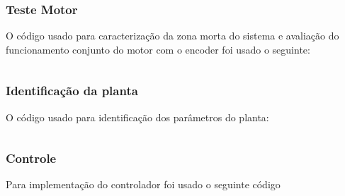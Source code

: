 \documentclass[a4paper,11pt]{article}
\begin{document}
\newpage
\subsubsection*{Teste Motor}
O código usado para caracterização da zona morta do sistema e avaliação do funcionamento conjunto do motor com o encoder foi usado o seguinte:
\inputminted[xleftmargin=15pt,linenos,frame=single,framesep=5pt,breaklines=true]{c++}{../arduino/test_dcmotor_characterization/test_dcmotor_characterization.ino}

\newpage
\subsubsection*{Identificação da planta}
O código usado para identificação dos parâmetros do planta:
\inputminted[xleftmargin=15pt,linenos,frame=single,framesep=5pt,breaklines=true]{c++}{../arduino/test_dcmotor_pulses/test_dcmotor_pulses.ino}

\newpage
\subsubsection*{Controle}
Para implementação do controlador foi usado o seguinte código
\inputminted[xleftmargin=15pt,linenos,frame=single,framesep=5pt,breaklines=true]{c++}{../arduino/pid_control/pid_control.ino}

\end{document}
